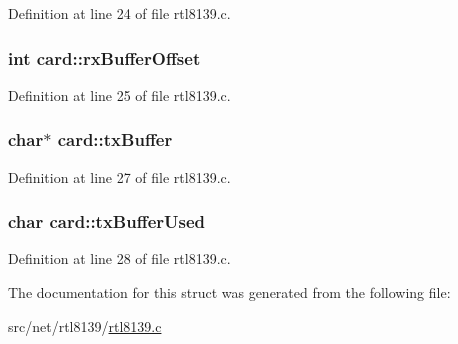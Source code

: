 Definition at line 24 of file rtl8139.\+c.

\hypertarget{structcard_a9492d8053fa4c304877e1f9959b48731}{
\subsubsection[{rx\+Buffer\+Offset}]{\setlength{\rightskip}{0pt plus 5cm}int card\+::rx\+Buffer\+Offset}}\label{structcard_a9492d8053fa4c304877e1f9959b48731}


Definition at line 25 of file rtl8139.\+c.

\hypertarget{structcard_a733cf5ffa3a9d2bf6cf28473817915b6}{
\subsubsection[{tx\+Buffer}]{\setlength{\rightskip}{0pt plus 5cm}char$\ast$ card\+::tx\+Buffer}}\label{structcard_a733cf5ffa3a9d2bf6cf28473817915b6}


Definition at line 27 of file rtl8139.\+c.

\hypertarget{structcard_a2294d3601ad6be7638b30f68496d589e}{
\subsubsection[{tx\+Buffer\+Used}]{\setlength{\rightskip}{0pt plus 5cm}char card\+::tx\+Buffer\+Used}}\label{structcard_a2294d3601ad6be7638b30f68496d589e}


Definition at line 28 of file rtl8139.\+c.



The documentation for this struct was generated from the following file\+:\begin{DoxyCompactItemize}
\item 
src/net/rtl8139/\hyperlink{rtl8139_8c}{rtl8139.\+c}\end{DoxyCompactItemize}

